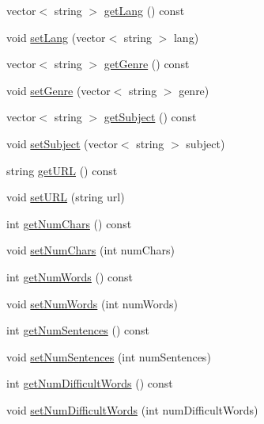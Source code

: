 \begin{DoxyCompactItemize}
\item 
vector$<$ string $>$ \hyperlink{classbridges_1_1_book_abb74d8c97070e1c3ead2d1223bfa420c}{get\+Lang} () const 
\item 
void \hyperlink{classbridges_1_1_book_acec57a03086884a8ebae4c608c19e5cf}{set\+Lang} (vector$<$ string $>$ lang)
\item 
vector$<$ string $>$ \hyperlink{classbridges_1_1_book_a0a7091fa2f7501bac398bbe8fb88a2bd}{get\+Genre} () const 
\item 
void \hyperlink{classbridges_1_1_book_a599852c24b9093e04fb124f21cb31419}{set\+Genre} (vector$<$ string $>$ genre)
\item 
vector$<$ string $>$ \hyperlink{classbridges_1_1_book_a16bde0ed60d0c3c3b2e3affd6de2f95a}{get\+Subject} () const 
\item 
void \hyperlink{classbridges_1_1_book_a9ee227f750be7ab000fb30cf361a8f5c}{set\+Subject} (vector$<$ string $>$ subject)
\item 
string \hyperlink{classbridges_1_1_book_a7cfb6efd92ca5e02b5874dc3c2bb070b}{get\+U\+R\+L} () const 
\item 
void \hyperlink{classbridges_1_1_book_a4a96a6bd3956056b450c9df13e976a5a}{set\+U\+R\+L} (string url)
\item 
int \hyperlink{classbridges_1_1_book_aa53d57e2eb2e53262bccb9273b5178fb}{get\+Num\+Chars} () const 
\item 
void \hyperlink{classbridges_1_1_book_a31f85f174ab86e6f9eb2131c3dbe1cdf}{set\+Num\+Chars} (int num\+Chars)
\item 
int \hyperlink{classbridges_1_1_book_ad6223c79c9ba0b4920e3bba81123c5fb}{get\+Num\+Words} () const 
\item 
void \hyperlink{classbridges_1_1_book_acbed3f0ff253868d8747826a27ef30ac}{set\+Num\+Words} (int num\+Words)
\item 
int \hyperlink{classbridges_1_1_book_a306ca71439518223ad4bb3c5329fd1a8}{get\+Num\+Sentences} () const 
\item 
void \hyperlink{classbridges_1_1_book_af16061c14c40b1672c7801a4c3a2d33b}{set\+Num\+Sentences} (int num\+Sentences)
\item 
int \hyperlink{classbridges_1_1_book_a8d769f0d1ddf5cf6809c72f9640fd6d8}{get\+Num\+Difficult\+Words} () const 
\item 
void \hyperlink{classbridges_1_1_book_adc7a54f2a494aeac02cadb3eb4caedbc}{set\+Num\+Difficult\+Words} (int num\+Difficult\+Words)
\end{DoxyCompactItemize}


